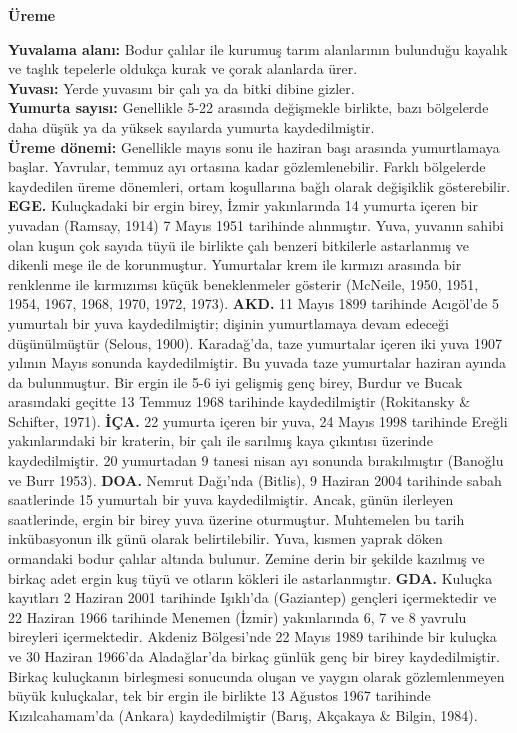 \documentclass[
  a4paper,
  DIV=11,
  numbers=noendperiod]{scrreprt}
\begin{document}
\textbf{Üreme}

\textbf{Yuvalama alanı:} Bodur çalılar ile kurumuş tarım alanlarının
bulunduğu kayalık ve taşlık tepelerle oldukça kurak ve çorak alanlarda
ürer.\\
\textbf{Yuvası:} Yerde yuvasını bir çalı ya da bitki dibine gizler.\\
\textbf{Yumurta sayısı:} Genellikle 5-22 arasında değişmekle birlikte,
bazı bölgelerde daha düşük ya da yüksek sayılarda yumurta
kaydedilmiştir.\\
\textbf{Üreme dönemi:} Genellikle mayıs sonu ile haziran başı arasında
yumurtlamaya başlar. Yavrular, temmuz ayı ortasına kadar
gözlemlenebilir. Farklı bölgelerde kaydedilen üreme dönemleri, ortam
koşullarına bağlı olarak değişiklik gösterebilir. \textbf{EGE.}
Kuluçkadaki bir ergin birey, İzmir yakınlarında 14 yumurta içeren bir
yuvadan (Ramsay, 1914) 7 Mayıs 1951 tarihinde alınmıştır. Yuva, yuvanın
sahibi olan kuşun çok sayıda tüyü ile birlikte çalı benzeri bitkilerle
astarlanmış ve dikenli meşe ile de korunmuştur. Yumurtalar krem ile
kırmızı arasında bir renklenme ile kırmızımsı küçük beneklenmeler
gösterir (McNeile, 1950, 1951, 1954, 1967, 1968, 1970, 1972, 1973).
\textbf{AKD.} 11 Mayıs 1899 tarihinde Acıgöl'de 5 yumurtalı bir yuva
kaydedilmiştir; dişinin yumurtlamaya devam edeceği düşünülmüştür
(Selous, 1900). Karadağ'da, taze yumurtalar içeren iki yuva 1907 yılının
Mayıs sonunda kaydedilmiştir. Bu yuvada taze yumurtalar haziran ayında
da bulunmuştur. Bir ergin ile 5-6 iyi gelişmiş genç birey, Burdur ve
Bucak arasındaki geçitte 13 Temmuz 1968 tarihinde kaydedilmiştir
(Rokitansky \& Schifter, 1971). \textbf{İÇA.} 22 yumurta içeren bir
yuva, 24 Mayıs 1998 tarihinde Ereğli yakınlarındaki bir kraterin, bir
çalı ile sarılmış kaya çıkıntısı üzerinde kaydedilmiştir. 20 yumurtadan
9 tanesi nisan ayı sonunda bırakılmıştır (Banoğlu ve Burr 1953).
\textbf{DOA.} Nemrut Dağı'nda (Bitlis), 9 Haziran 2004 tarihinde sabah
saatlerinde 15 yumurtalı bir yuva kaydedilmiştir. Ancak, günün ilerleyen
saatlerinde, ergin bir birey yuva üzerine oturmuştur. Muhtemelen bu
tarih inkübasyonun ilk günü olarak belirtilebilir. Yuva, kısmen yaprak
döken ormandaki bodur çalılar altında bulunur. Zemine derin bir şekilde
kazılmış ve birkaç adet ergin kuş tüyü ve otların kökleri ile
astarlanmıştır. \textbf{GDA.} Kuluçka kayıtları 2 Haziran 2001 tarihinde
Işıklı'da (Gaziantep) gençleri içermektedir ve 22 Haziran 1966 tarihinde
Menemen (İzmir) yakınlarında 6, 7 ve 8 yavrulu bireyleri içermektedir.
Akdeniz Bölgesi'nde 22 Mayıs 1989 tarihinde bir kuluçka ve 30 Haziran
1966'da Aladağlar'da birkaç günlük genç bir birey kaydedilmiştir. Birkaç
kuluçkanın birleşmesi sonucunda oluşan ve yaygın olarak gözlemlenmeyen
büyük kuluçkalar, tek bir ergin ile birlikte 13 Ağustos 1967 tarihinde
Kızılcahamam'da (Ankara) kaydedilmiştir (Barış, Akçakaya \& Bilgin,
1984).
\end{document}

